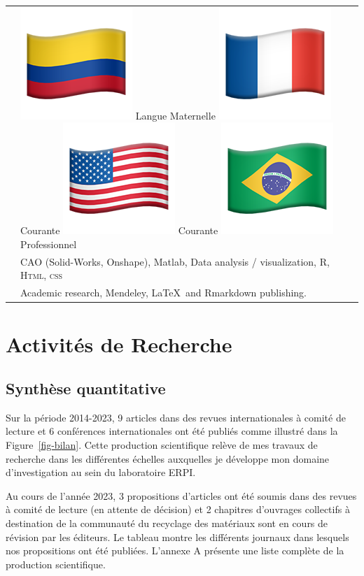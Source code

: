 \documentclass[
  11pt,
]{article}
\begin{document}
\extrarowsep=3pt
\begin{tabu} to \linewidth {X[0.1,l] X[2,l]}

  & 
\includegraphics[width=2ex]{Figures/icons/flag-colombia.png} Langue Maternelle\quad 
\includegraphics[width=2ex]{Figures/icons/flag-france.png} Courante  \quad\includegraphics[width=2ex]{Figures/icons/flag-usa.png} Courante  \quad
\includegraphics[width=2ex]{Figures/icons/flag-brazil.png} Professionnel \\[5pt] 


  & CAO (Solid-Works, Onshape), Matlab,  Data analysis / visualization, R, \textsc{Html, css} \\[5pt]
    

  & Academic research,  Mendeley, \LaTeX ~and Rmarkdown publishing.

\end{tabu}

\hypertarget{activituxe9s-de-recherche}{%
\section{Activités de Recherche}\label{activituxe9s-de-recherche}}

\hypertarget{synthuxe8se-quantitative}{%
\subsection{Synthèse quantitative}\label{synthuxe8se-quantitative}}

Sur la période 2014-2023, 9 articles dans des revues internationales à
comité de lecture et 6 conférences internationales ont été publiés comme
illustré dans la Figure~\ref{fig-bilan}. Cette production scientifique
relève de mes travaux de recherche dans les différentes échelles
auxquelles je développe mon domaine d'investigation au sein du
laboratoire ERPI.

Au cours de l'année 2023, 3 propositions d'articles ont été soumis dans
des revues à comité de lecture (en attente de décision) et 2 chapitres
d'ouvrages collectifs à destination de la communauté du recyclage des
matériaux sont en cours de révision par les éditeurs. Le tableau montre
les différents journaux dans lesquels nos propositions ont été publiées.
L'annexe A présente une liste complète de la production scientifique.
\end{document}
